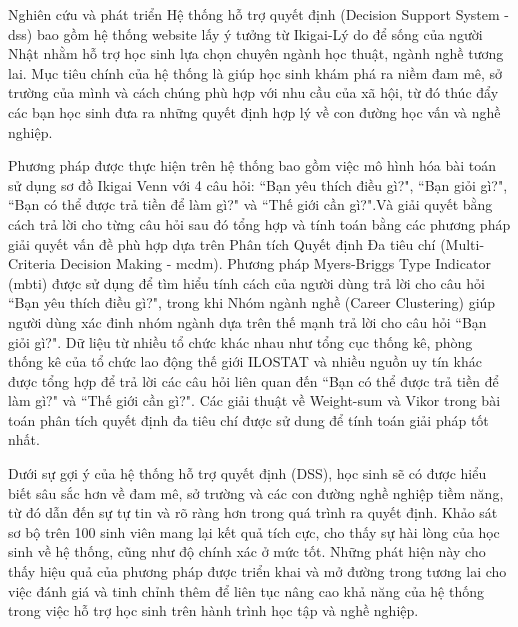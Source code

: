 Nghiên cứu và phát triển Hệ thống hỗ trợ quyết định (Decision Support System - \acrshort{dss}) bao gồm hệ thống website lấy ý tưởng từ Ikigai-Lý do để sống của người Nhật nhằm hỗ trợ học sinh lựa chọn chuyên ngành học thuật, ngành nghề tương lai. Mục tiêu chính của hệ thống là giúp học sinh khám phá ra niềm đam mê, sở trường của mình và cách chúng phù hợp với nhu cầu của xã hội, từ đó thúc đẩy các bạn học sinh đưa ra những quyết định hợp lý về con đường học vấn và nghề nghiệp.

Phương pháp được thực hiện trên hệ thống bao gồm việc mô hình hóa bài toán sử dụng sơ đồ Ikigai Venn với 4 câu hỏi: ``Bạn yêu thích điều gì?", ``Bạn giỏi gì?", ``Bạn có thể được trả tiền để làm gì?" và ``Thế giới cần gì?".Và giải quyết bằng cách trả lời cho từng câu hỏi sau đó tổng hợp và tính toán bằng các phương pháp giải quyết vấn đề phù hợp dựa trên Phân tích Quyết định Đa tiêu chí (Multi-Criteria Decision Making - \acrshort{mcdm}). Phương pháp Myers-Briggs Type Indicator (\acrshort{mbti}) được sử dụng để tìm hiểu tính cách của người dùng trả lời cho câu hỏi ``Bạn yêu thích điều gì?", trong khi Nhóm ngành nghề (Career Clustering) giúp người dùng xác đinh nhóm ngành dựa trên thế mạnh trả lời cho câu hỏi ``Bạn giỏi gì?". Dữ liệu từ nhiều tổ chức khác nhau như tổng cục thống kê, phòng thống kê của tổ chức lao động thế giới ILOSTAT và nhiều nguồn uy tín khác được tổng hợp để trả lời các câu hỏi liên quan đến ``Bạn có thể được trả tiền để làm gì?" và ``Thế giới cần gì?". Các giải thuật về Weight-sum và Vikor trong bài toán phân tích quyết định đa tiêu chí được sử dung để tính toán giải pháp tốt nhất.

Dưới sự gợi ý của hệ thống hỗ trợ quyết định (DSS), học sinh sẽ có được hiểu biết sâu sắc hơn về đam mê, sở trường và các con đường nghề nghiệp tiềm năng, từ đó dẫn đến sự tự tin và rõ ràng hơn trong quá trình ra quyết định. Khảo sát sơ bộ trên 100 sinh viên mang lại kết quả tích cực, cho thấy sự hài lòng của học sinh về hệ thống, cũng như độ chính xác ở mức tốt. Những phát hiện này cho thấy hiệu quả của phương pháp được triển khai và mở đường trong tương lai cho việc đánh giá và tinh chỉnh thêm để liên tục nâng cao khả năng của hệ thống trong việc hỗ trợ học sinh trên hành trình học tập và nghề nghiệp.